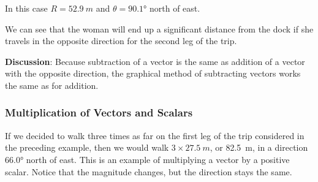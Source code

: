 \documentclass[../../main-ap-physics.tex]{subfiles}
\begin{document}
\begin{center}
\end{center}

In this case  $R = \SI{52.9}{m}$ and $\theta = \ang{90.1}$ north of east.

\vspace{1em}

We can see that the woman will end up a significant distance from the dock if she travels in the opposite direction for the second leg of the trip.

\vspace{1em}

\textbf{Discussion}: Because subtraction of a vector is the same as addition of a vector with the opposite direction, the graphical method of subtracting vectors works the same as for addition.

\endsolution

\subsubsection*{Multiplication of Vectors and Scalars}

If we decided to walk three times as far on the first leg of the trip considered in the preceding example, then we would walk $3 \times \SI{27.5}{m}$, or \SI{82.5}{m}, in a direction \ang{66.0} north of east. This is an example of multiplying a vector by a positive scalar. Notice that the magnitude changes, but the direction stays the same.
\end{document}
